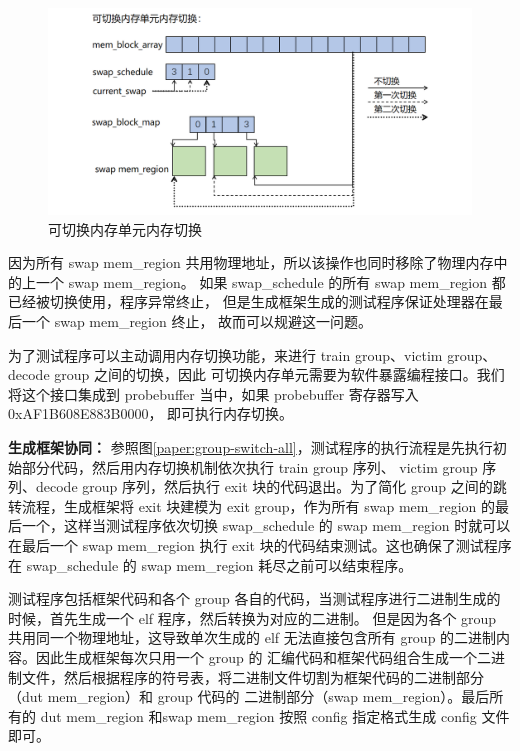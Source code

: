 \begin{figure}[!h]
    \centering
    \includegraphics[width=\linewidth]{figure/paper/swap-mem-swap.png}
    \caption{可切换内存单元内存切换}
    \label{paper:swap-mem-swap}
\end{figure}

因为所有 swap mem\_region 共用物理地址，所以该操作也同时移除了物理内存中的上一个 swap mem\_region。
如果 swap\_schedule 的所有 swap mem\_region 都已经被切换使用，程序异常终止，
但是生成框架生成的测试程序保证处理器在最后一个 swap mem\_region 终止，
故而可以规避这一问题。\par

为了测试程序可以主动调用内存切换功能，来进行 train group、victim group、decode group 之间的切换，因此
可切换内存单元需要为软件暴露编程接口。我们将这个接口集成到 probebuffer 当中，如果 probebuffer 寄存器写入 0xAF1B608E883B0000，
即可执行内存切换。

\textbf{生成框架协同：}
参照图\ref{paper:group-switch-all}，测试程序的执行流程是先执行初始部分代码，然后用内存切换机制依次执行 train group 序列、
victim group 序列、decode group 序列，然后执行 exit 块的代码退出。为了简化 group 之间的跳转流程，生成框架将 exit 块建模为
 exit group，作为所有 swap mem\_region 的最后一个，这样当测试程序依次切换 swap\_schedule 的 swap mem\_region 时就可以
在最后一个 swap mem\_region 执行 exit 块的代码结束测试。这也确保了测试程序在 swap\_schedule 的 swap mem\_region 耗尽之前可以结束程序。\par

测试程序包括框架代码和各个 group 各自的代码，当测试程序进行二进制生成的时候，首先生成一个 elf 程序，然后转换为对应的二进制。
但是因为各个 group 共用同一个物理地址，这导致单次生成的 elf 无法直接包含所有 group 的二进制内容。因此生成框架每次只用一个 group 的
汇编代码和框架代码组合生成一个二进制文件，然后根据程序的符号表，将二进制文件切割为框架代码的二进制部分（dut mem\_region）和 group 代码的
二进制部分（swap mem\_region）。最后所有的 dut mem\_region 和swap mem\_region 按照 config 指定格式生成 config 文件即可。\par


